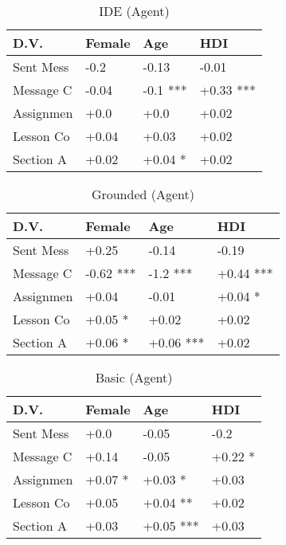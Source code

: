 \begin{table}[t]
\begin{center}
\begin{tabularx}{\columnwidth}{lXXX}
\toprule
D.V. & Female & Age & HDI \\
\midrule
Sent Mess & -0.2 & -0.13 & -0.01 \\
Message C & -0.04 & -0.1 *** & +0.33 *** \\
Assignmen & +0.0 & +0.0 & +0.02 \\
Lesson Co & +0.04 & +0.03 & +0.02 \\
Section A & +0.02 & +0.04 * & +0.02 \\
\bottomrule
\end{tabularx}
\end{center}
\caption{IDE (Agent)}
\label{tab:demo_table}
\end{table}

\begin{table}[t]
\begin{center}
\begin{tabularx}{\columnwidth}{lXXX}
\toprule
D.V. & Female & Age & HDI \\
\midrule
Sent Mess & +0.25 & -0.14 & -0.19 \\
Message C & -0.62 *** & -1.2 *** & +0.44 *** \\
Assignmen & +0.04 & -0.01 & +0.04 * \\
Lesson Co & +0.05 * & +0.02 & +0.02 \\
Section A & +0.06 * & +0.06 *** & +0.02 \\
\bottomrule
\end{tabularx}
\end{center}
\caption{Grounded (Agent)}
\label{tab:demo_table}
\end{table}

\begin{table}[t]
\begin{center}
\begin{tabularx}{\columnwidth}{lXXX}
\toprule
D.V. & Female & Age & HDI \\
\midrule
Sent Mess & +0.0 & -0.05 & -0.2 \\
Message C & +0.14 & -0.05 & +0.22 * \\
Assignmen & +0.07 * & +0.03 * & +0.03 \\
Lesson Co & +0.05 & +0.04 ** & +0.02 \\
Section A & +0.03 & +0.05 *** & +0.03 \\
\bottomrule
\end{tabularx}
\end{center}
\caption{Basic (Agent)}
\label{tab:demo_table}
\end{table}

